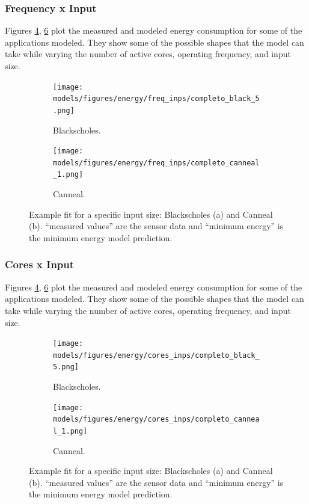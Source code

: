\subsubsection{Frequency x Input}
Figures \ref{fig:en_eq_black}, \ref{fig:en_eq_canneal} plot the measured and modeled energy consumption for some of the applications modeled. They  show some of the possible shapes that the model can take while varying the number of active cores, operating frequency, and input size.
\begin{figure}[H]
	\centering
	\begin{subfigure}[b]{0.48\textwidth}
		\centerline{\texttt{[image: models/figures/energy/freq\_inps/completo\_black\_5.png]}}
		\caption{Blackscholes.}
		\label{fig:en_eq_black}
	\end{subfigure}
	\begin{subfigure}[b]{0.48\textwidth}
		\centerline{\texttt{[image: models/figures/energy/freq\_inps/completo\_canneal\_1.png]}}
		\caption{Canneal.}
		\label{fig:en_eq_canneal}
	\end{subfigure}
	\caption{Example fit for a specific input size: Blackscholes (a) and Canneal (b).  “measured values” are the sensor data and “minimum energy” is the minimum energy model prediction.
	}
\end{figure}
\subsubsection{Cores x Input}
Figures \ref{fig:en_eq_black}, \ref{fig:en_eq_canneal} plot the measured and modeled energy consumption for some of the applications modeled. They  show some of the possible shapes that the model can take while varying the number of active cores, operating frequency, and input size.
\begin{figure}[H]
	\centering
	\begin{subfigure}[b]{0.48\textwidth}
		\centerline{\texttt{[image: models/figures/energy/cores\_inps/completo\_black\_5.png]}}
		\caption{Blackscholes.}
		\label{fig:en_eq_black}
	\end{subfigure}
	\begin{subfigure}[b]{0.48\textwidth}
		\centerline{\texttt{[image: models/figures/energy/cores\_inps/completo\_canneal\_1.png]}}
		\caption{Canneal.}
		\label{fig:en_eq_canneal}
	\end{subfigure}
	\caption{Example fit for a specific input size: Blackscholes (a) and Canneal (b).  “measured values” are the sensor data and “minimum energy” is the minimum energy model prediction.
	}
\end{figure}


